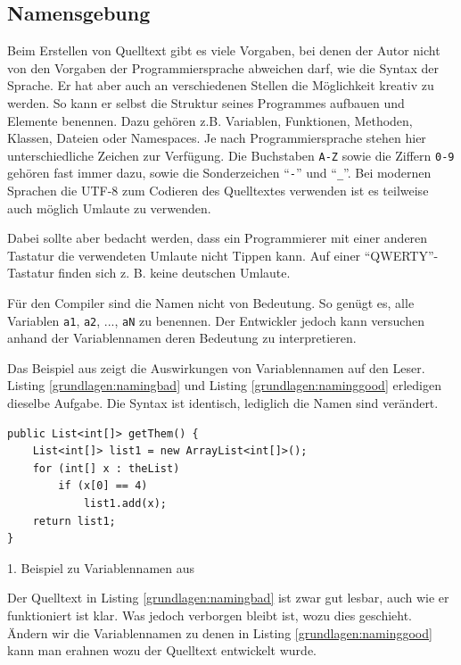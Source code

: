 \subsection{Namensgebung}

Beim Erstellen von Quelltext gibt es viele Vorgaben, bei denen der Autor nicht von den Vorgaben der Programmiersprache abweichen darf, wie die Syntax der Sprache.
Er hat aber auch an verschiedenen Stellen die Möglichkeit kreativ zu werden. So kann er selbst die Struktur seines Programmes aufbauen und Elemente benennen.
Dazu gehören z.B. Variablen, Funktionen, Methoden, Klassen, Dateien oder Namespaces.
Je nach Programmiersprache stehen hier unterschiedliche Zeichen zur Verfügung.
Die Buchstaben \texttt{A-Z} sowie die Ziffern \texttt{0-9} gehören fast immer dazu, sowie die
Sonderzeichen \enquote{\texttt{-}} und \enquote{\texttt{\_}}. Bei modernen Sprachen die UTF-8
zum Codieren des Quelltextes verwenden ist es teilweise auch möglich Umlaute zu verwenden.

Dabei sollte aber bedacht werden, dass ein Programmierer mit einer anderen
Tastatur die verwendeten Umlaute nicht Tippen kann. Auf einer \enquote{QWERTY}-Tastatur finden sich z. B. keine deutschen Umlaute.

Für den Compiler sind die Namen nicht von Bedeutung. So genügt es, alle Variablen \texttt{a1},
\texttt{a2}, ..., \texttt{aN} zu benennen. Der Entwickler jedoch kann versuchen anhand der  Variablennamen deren Bedeutung zu  interpretieren.

Das Beispiel aus \cite[S. 46-47]{Martin} zeigt die Auswirkungen von Variablennamen auf den Leser. Listing \ref{grundlagen:namingbad} und Listing \ref{grundlagen:naminggood} erledigen dieselbe Aufgabe. Die Syntax ist identisch, lediglich die Namen sind verändert.

\begin{listing}
    \begin{verbatim}
public List<int[]> getThem() {
    List<int[]> list1 = new ArrayList<int[]>();
    for (int[] x : theList)
        if (x[0] == 4)
            list1.add(x);
    return list1;
}
    \end{verbatim}
    \caption{1. Beispiel zu Variablennamen aus \cite[S. 46]{Martin}}
    \label{grundlagen:namingbad}
\end{listing}

Der Quelltext in Listing \ref{grundlagen:namingbad} ist zwar gut lesbar, auch wie er funktioniert ist klar. Was jedoch verborgen bleibt ist, wozu dies geschieht. 
Ändern wir die Variablennamen zu denen in Listing \ref{grundlagen:naminggood} kann man erahnen wozu der Quelltext entwickelt wurde.

